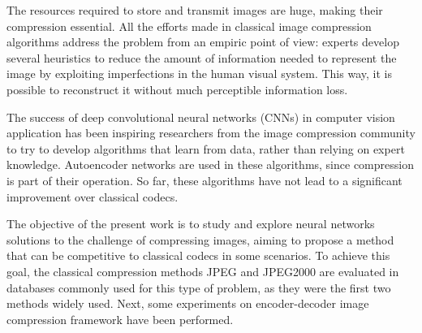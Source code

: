 The resources required to store and transmit images are huge, making their compression essential. All the efforts made in classical image compression algorithms address the problem from an empiric point of view: experts develop several heuristics to reduce the amount of information needed to represent the image by exploiting imperfections in the human visual system. This way, it is possible to reconstruct it without much perceptible information loss.

The success of deep convolutional neural networks (CNNs) in computer vision application has been inspiring researchers from the image compression community to try to develop algorithms that learn from data, rather than relying on expert knowledge. Autoencoder networks are used in these algorithms, since compression is part of their operation. So far, these algorithms have not lead to a significant improvement over classical codecs.

The objective of the present work is to study and explore neural networks solutions to the challenge of compressing images, aiming to propose a method that can be competitive to classical codecs in some scenarios. To achieve this goal, the classical compression methods JPEG and JPEG2000 are evaluated in databases commonly used for this type of problem, as they were the first two methods widely used. Next, some experiments on encoder-decoder image compression framework have been performed.


